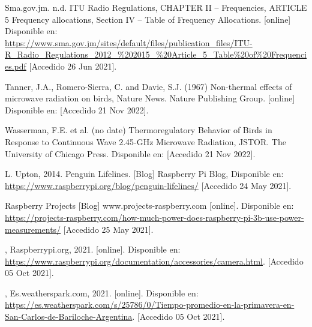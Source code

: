 \begin{flushleft}
\begin{thebibliography}{9}
Sma.gov.jm. n.d. ITU Radio Regulations, CHAPTER II – Frequencies, ARTICLE 5 Frequency allocations, Section IV – Table of Frequency Allocations. [online] Disponible en: \href{https://www.sma.gov.jm/sites/default/files/publication_files/ITU-R_Radio_Regulations_2012_\%202015_\%20Article_5_Table\%20of\%20Frequencies.pdf}{https://www.sma.gov.jm/sites/default/files/publication\_files/ITU-R\_Radio\_Regulations\_2012\_\%202015\_\%20Article\_5\_Table\%20of\%20Frequencies.pdf} [Accedido 26 Jun 2021].

Tanner, J.A., Romero-Sierra, C. and Davie, S.J. (1967) Non-thermal effects of microwave radiation on birds, Nature News. Nature Publishing Group. [online] Disponible en:  [Accedido 21 Nov 2022].

Wasserman, F.E. et al. (no date) Thermoregulatory Behavior of Birds in Response to Continuous Wave 2.45-GHz Microwave Radiation, JSTOR. The University of Chicago Press. Disponible en:  [Accedido 21 Nov 2022].

L. Upton, 2014. Penguin Lifelines. [Blog] Raspberry Pi Blog, Disponible en: \href{https://www.raspberrypi.org/blog/penguin-lifelines/}{https://www.raspberrypi.org/blog/penguin-lifelines/} [Accedido 24 May 2021].

Raspberry Projects [Blog] www.projects-raspberry.com [online]. Disponible en: \href{https://projects-raspberry.com/how-much-power-does-raspberry-pi-3b-use-power-measurements/}{https://projects-raspberry.com/how-much-power-does-raspberry-pi-3b-use-power-measurements/} [Accedido 25 May 2021].

, Raspberrypi.org, 2021. [online]. Disponible en: \href{https://www.raspberrypi.org/documentation/accessories/camera.html}{https://www.raspberrypi.org/documentation/accessories/camera.html}. [Accedido 05  Oct 2021].

, Es.weatherspark.com, 2021. [online]. Disponible en: \href{https://es.weatherspark.com/s/25786/0/Tiempo-promedio-en-la-primavera-en-San-Carlos-de-Bariloche-Argentina}{https://es.weatherspark.com/s/25786/0/Tiempo-promedio-en-la-primavera-en-San-Carlos-de-Bariloche-Argentina}. [Accedido 05 Oct 2021].


\end{thebibliography}
\end{flushleft}
